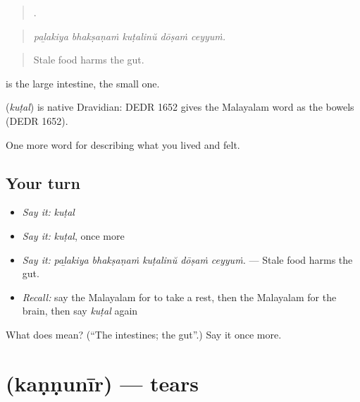 \begin{quote}
    .
\end{quote}

\begin{quote}
\emph{paḻakiya bhakṣaṇaṁ kuṭalinŭ dōṣaṁ ceyyuṁ.}
\end{quote}

\begin{quote}
Stale food harms the gut.
\end{quote}

 is the large intestine,  the small one.

\begin{cousinweb}
\textbf{} (\emph{kuṭal}) is native Dravidian: DEDR 1652 gives the Malayalam word as the bowels (DEDR 1652).
\end{cousinweb}

\begin{grammarlens}[title={What you've built}]
One more word for describing what you lived and felt.
\end{grammarlens}

\subsection*{Your turn}
\begin{itemize}
\raggedright
  \item \emph{Say it:} \emph{kuṭal}
  \item \emph{Say it:} \emph{kuṭal}, once more
  \item \emph{Say it:} \emph{paḻakiya bhakṣaṇaṁ kuṭalinŭ dōṣaṁ ceyyuṁ.} — Stale food harms the gut.
  \item \emph{Recall:} say the Malayalam for to take a rest, then the Malayalam for the brain, then say \emph{kuṭal} again
\end{itemize}

\begin{tcolorbox}[breakable,colback=teal!4,colframe=teal!35!black,title={Before you move on}]
What does  mean? (\textquotedblleft{}The intestines; the gut\textquotedblright{}.) Say it once more.
\end{tcolorbox}
\section[\texorpdfstring{\ml{കണ്ണുനീർ} (kaṇṇunīr)}{കണ്ണുനീർ (kaṇṇunīr)}]{ (kaṇṇunīr) — tears}

